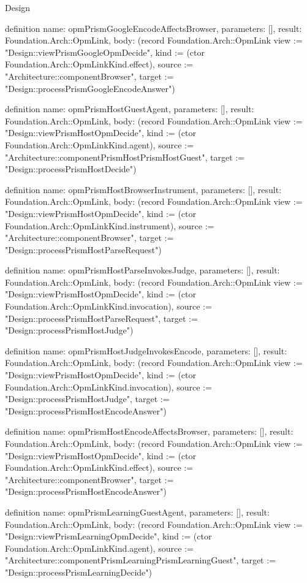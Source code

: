 \begin{lexlean}{Design}
\begin{semanticmodule}
definition{
  name: opmPrismGoogleEncodeAffectsBrowser,
  parameters: [],
  result: Foundation.Arch::OpmLink,
  body: (record Foundation.Arch::OpmLink {view := "Design::viewPrismGoogleOpmDecide", kind := (ctor Foundation.Arch::OpmLinkKind.effect), source := "Architecture::componentBrowser", target := "Design::processPrismGoogleEncodeAnswer"})
}

definition{
  name: opmPrismHostGuestAgent,
  parameters: [],
  result: Foundation.Arch::OpmLink,
  body: (record Foundation.Arch::OpmLink {view := "Design::viewPrismHostOpmDecide", kind := (ctor Foundation.Arch::OpmLinkKind.agent), source := "Architecture::componentPrismHostPrismHostGuest", target := "Design::processPrismHostDecide"})
}

definition{
  name: opmPrismHostBrowserInstrument,
  parameters: [],
  result: Foundation.Arch::OpmLink,
  body: (record Foundation.Arch::OpmLink {view := "Design::viewPrismHostOpmDecide", kind := (ctor Foundation.Arch::OpmLinkKind.instrument), source := "Architecture::componentBrowser", target := "Design::processPrismHostParseRequest"})
}

definition{
  name: opmPrismHostParseInvokesJudge,
  parameters: [],
  result: Foundation.Arch::OpmLink,
  body: (record Foundation.Arch::OpmLink {view := "Design::viewPrismHostOpmDecide", kind := (ctor Foundation.Arch::OpmLinkKind.invocation), source := "Design::processPrismHostParseRequest", target := "Design::processPrismHostJudge"})
}

definition{
  name: opmPrismHostJudgeInvokesEncode,
  parameters: [],
  result: Foundation.Arch::OpmLink,
  body: (record Foundation.Arch::OpmLink {view := "Design::viewPrismHostOpmDecide", kind := (ctor Foundation.Arch::OpmLinkKind.invocation), source := "Design::processPrismHostJudge", target := "Design::processPrismHostEncodeAnswer"})
}

definition{
  name: opmPrismHostEncodeAffectsBrowser,
  parameters: [],
  result: Foundation.Arch::OpmLink,
  body: (record Foundation.Arch::OpmLink {view := "Design::viewPrismHostOpmDecide", kind := (ctor Foundation.Arch::OpmLinkKind.effect), source := "Architecture::componentBrowser", target := "Design::processPrismHostEncodeAnswer"})
}

definition{
  name: opmPrismLearningGuestAgent,
  parameters: [],
  result: Foundation.Arch::OpmLink,
  body: (record Foundation.Arch::OpmLink {view := "Design::viewPrismLearningOpmDecide", kind := (ctor Foundation.Arch::OpmLinkKind.agent), source := "Architecture::componentPrismLearningPrismLearningGuest", target := "Design::processPrismLearningDecide"})
}


\end{semanticmodule}
\end{lexlean}

